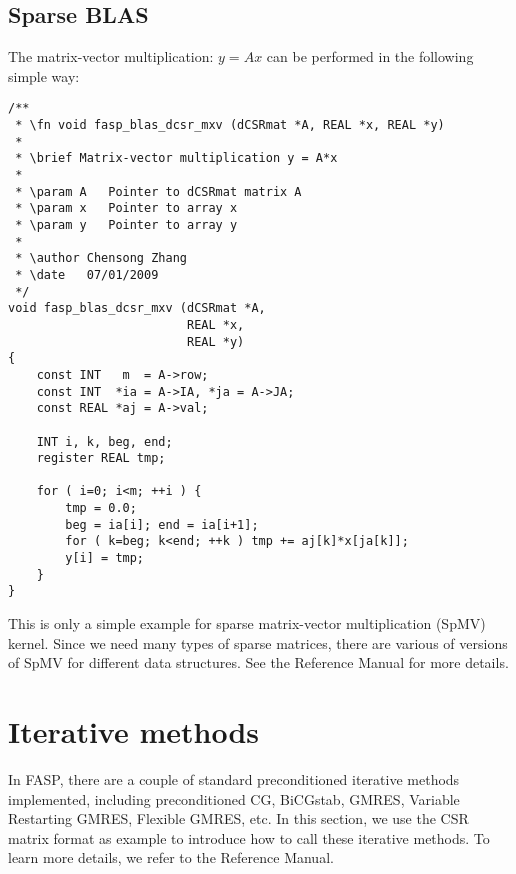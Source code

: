 \documentclass[11pt]{memoir}
\begin{document}
\subsection{Sparse BLAS}

The matrix-vector multiplication: $y=Ax$ can be performed in the
following simple way:

\begin{lstlisting}
/**
 * \fn void fasp_blas_dcsr_mxv (dCSRmat *A, REAL *x, REAL *y) 
 *
 * \brief Matrix-vector multiplication y = A*x
 *
 * \param A   Pointer to dCSRmat matrix A
 * \param x   Pointer to array x
 * \param y   Pointer to array y
 *
 * \author Chensong Zhang
 * \date   07/01/2009
 */
void fasp_blas_dcsr_mxv (dCSRmat *A, 
                         REAL *x, 
                         REAL *y)
{
    const INT   m  = A->row;
    const INT  *ia = A->IA, *ja = A->JA;
    const REAL *aj = A->val;
    
    INT i, k, beg, end;    
    register REAL tmp;
    
    for ( i=0; i<m; ++i ) {
        tmp = 0.0; 
        beg = ia[i]; end = ia[i+1]; 
        for ( k=beg; k<end; ++k ) tmp += aj[k]*x[ja[k]];
        y[i] = tmp;
    }
}
\end{lstlisting}

This is only a simple example for sparse matrix-vector multiplication (SpMV) kernel. Since we need many types of sparse matrices, there are various of versions of SpMV for different data structures. See the Reference Manual for more details. 

\section{Iterative methods}\label{sec:iter}

In FASP, there are a couple of standard preconditioned iterative methods
~\cite{Saad.Saad.2003fv} implemented, including preconditioned CG, BiCGstab, GMRES, Variable Restarting GMRES, Flexible GMRES, etc. In this section, we use the CSR matrix format as example to introduce how to call these iterative methods. To learn more details, we refer to the Reference Manual.
\end{document}
